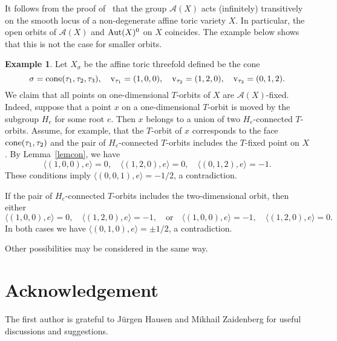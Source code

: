 \documentclass[12pt,a4paper]{amsart}
\theoremstyle{plain}
\theoremstyle{definition}
\newtheorem{example}{Example}
\begin{document}
It follows from the proof of~\cite[Theorem~2.1]{AKZ} that the group ${{\mathcal{A}}}(X)$
acts (infinitely) transitively on the smooth locus of a non-degenerate affine
toric variety $X$. In particular, the open orbits of ${{\mathcal{A}}}(X)$ and
${\mathop{\rm Aut}}(X)^0$ on $X$ coincides. The example below shows that this is not the case for
smaller orbits.

\begin{example}
Let $X_{\sigma}$ be the affine toric threefold defined be the cone
$$
\sigma=\rm{cone}(\tau_1,\tau_2,\tau_3), \quad v_{\tau_1}=(1,0,0),
\quad v_{\tau_2}=(1,2,0), \quad v_{\tau_3}=(0,1,2).
$$
We claim that all points on one-dimensional $T$-orbits of $X$ are ${{\mathcal{A}}}(X)$-fixed.
Indeed, suppose that a point $x$ on a one-dimensional $T$-orbit is moved by
the subgroup $H_e$ for some root $e$. Then $x$ belongs to a union of two
$H_e$-connected $T$-orbits. Assume, for example, that the $T$-orbit of $x$ corresponds
to the face $\rm{cone}(\tau_1,\tau_2)$ and the pair
of $H_e$-connected $T$-orbits includes the $T$-fixed point on $X$. By Lemma~\ref{lemcon},
we have
$$
\langle (1,0,0), e\rangle=0, \quad \langle (1,2,0), e\rangle=0,
\quad \langle (0,1,2), e\rangle=-1.
$$
These conditions imply $\langle (0,0,1), e\rangle=-1/2$, a contradiction.

If the pair of $H_e$-connected $T$-orbits includes the two-dimensional orbit, then
either
$$
\langle (1,0,0), e\rangle=0, \quad \langle (1,2,0), e\rangle=-1, \quad \text{or} \quad
\langle (1,0,0), e\rangle=-1, \quad \langle (1,2,0), e\rangle=0.
$$
In both cases we have $\langle (0,1,0), e\rangle=\pm 1/2$, a contradiction.

Other possibilities may be considered in the same way.
\end{example}

\section*{Acknowledgement}

The first author is grateful to J\"urgen Hausen and Mikhail Zaidenberg
for useful discussions and suggestions.
\end{document}
